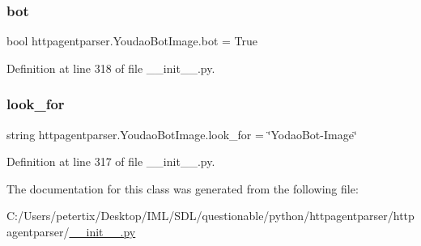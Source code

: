 \subsubsection{\texorpdfstring{bot}{bot}}
{\footnotesize\ttfamily bool httpagentparser.\+Youdao\+Bot\+Image.\+bot = True\hspace{0.3cm}{\ttfamily [static]}}



Definition at line 318 of file \+\_\+\+\_\+init\+\_\+\+\_\+.\+py.

\hypertarget{classhttpagentparser_1_1_youdao_bot_image_a172b7acb0758b421c18b728e18f0e242}{}\label{classhttpagentparser_1_1_youdao_bot_image_a172b7acb0758b421c18b728e18f0e242} 
\subsubsection{\texorpdfstring{look\+\_\+for}{look\_for}}
{\footnotesize\ttfamily string httpagentparser.\+Youdao\+Bot\+Image.\+look\+\_\+for = \char`\"{}Yodao\+Bot-\/Image\char`\"{}\hspace{0.3cm}{\ttfamily [static]}}



Definition at line 317 of file \+\_\+\+\_\+init\+\_\+\+\_\+.\+py.



The documentation for this class was generated from the following file\+:\begin{DoxyCompactItemize}
\item 
C\+:/\+Users/petertix/\+Desktop/\+I\+M\+L/\+S\+D\+L/questionable/python/httpagentparser/httpagentparser/\hyperlink{____init_____8py}{\+\_\+\+\_\+init\+\_\+\+\_\+.\+py}\end{DoxyCompactItemize}
